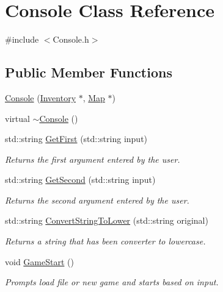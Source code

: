 \hypertarget{class_console}{}\section{Console Class Reference}
\label{class_console}


{\ttfamily \#include $<$Console.\+h$>$}

\subsection*{Public Member Functions}
\begin{DoxyCompactItemize}
\item 
\mbox{\hyperlink{class_console_ac9b6509da71c28ff64a4112b369c4143}{Console}} (\mbox{\hyperlink{class_inventory}{Inventory}} $\ast$, \mbox{\hyperlink{class_map}{Map}} $\ast$)
\item 
virtual \mbox{\hyperlink{class_console_a32e8c79c8579b1b076e53848c540d4e7}{$\sim$\+Console}} ()
\item 
std\+::string \mbox{\hyperlink{class_console_a851f8712372b31495dda2af8456d24aa}{Get\+First}} (std\+::string input)
\begin{DoxyCompactList}\small\item\em Returns the first argument entered by the user. \end{DoxyCompactList}\item 
std\+::string \mbox{\hyperlink{class_console_a6399615a1ca63091429ec486d2e0e1f9}{Get\+Second}} (std\+::string input)
\begin{DoxyCompactList}\small\item\em Returns the second argument entered by the user. \end{DoxyCompactList}\item 
std\+::string \mbox{\hyperlink{class_console_aee315491a0fcd06f3c27fdea7810191c}{Convert\+String\+To\+Lower}} (std\+::string original)
\begin{DoxyCompactList}\small\item\em Returns a string that has been converter to lowercase. \end{DoxyCompactList}\item 
void \mbox{\hyperlink{class_console_a2d9d321db0a9bf028c69e70f7aae68dd}{Game\+Start}} ()
\begin{DoxyCompactList}\small\item\em Prompts load file or new game and starts based on input. \end{DoxyCompactList}\item 

\end{DoxyCompactItemize}
